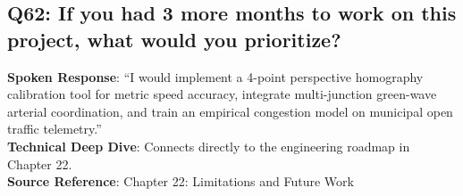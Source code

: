 \subsection*{Q62: If you had 3 more months to work on this project, what would you prioritize?}
\begin{interviewbox}
\textbf{Spoken Response}: ``I would implement a 4-point perspective homography calibration tool for metric speed accuracy, integrate multi-junction green-wave arterial coordination, and train an empirical congestion model on municipal open traffic telemetry.''\\
\textbf{Technical Deep Dive}: Connects directly to the engineering roadmap in Chapter 22.\\
\textbf{Source Reference}: Chapter 22: Limitations and Future Work
\end{interviewbox}
